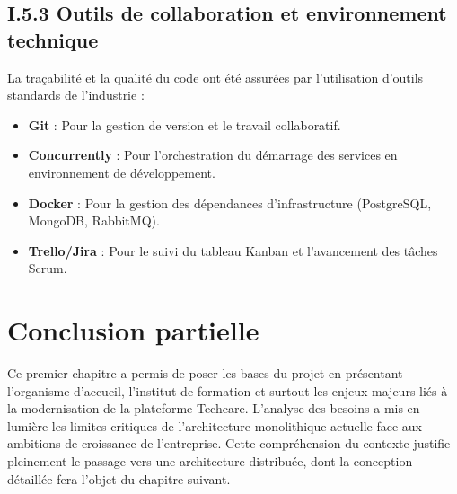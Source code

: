 \subsection{I.5.3 Outils de collaboration et environnement technique}

La traçabilité et la qualité du code ont été assurées par l'utilisation d'outils standards de l'industrie :
\begin{itemize}
    \item \textbf{Git} : Pour la gestion de version et le travail collaboratif.
    \item \textbf{Concurrently} : Pour l'orchestration du démarrage des services en environnement de développement.
    \item \textbf{Docker} : Pour la gestion des dépendances d'infrastructure (PostgreSQL, MongoDB, RabbitMQ).
    \item \textbf{Trello/Jira} : Pour le suivi du tableau Kanban et l'avancement des tâches Scrum.
\end{itemize}

\section*{Conclusion partielle}
Ce premier chapitre a permis de poser les bases du projet en présentant l'organisme d'accueil, l'institut de formation et surtout les enjeux majeurs liés à la modernisation de la plateforme Techcare. L'analyse des besoins a mis en lumière les limites critiques de l'architecture monolithique actuelle face aux ambitions de croissance de l'entreprise. Cette compréhension du contexte justifie pleinement le passage vers une architecture distribuée, dont la conception détaillée fera l'objet du chapitre suivant.
